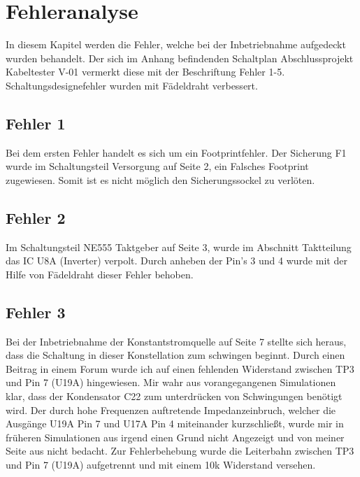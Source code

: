 \section{Fehleranalyse}

\begin{center}
In diesem Kapitel werden die Fehler, welche bei der Inbetriebnahme aufgedeckt wurden behandelt. Der sich im Anhang befindenden Schaltplan \glqq Abschlussprojekt Kabeltester  V-01\grqq{} vermerkt diese mit der Beschriftung \glqq Fehler 1-5\grqq{}. Schaltungsdesignefehler wurden mit Fädeldraht verbessert.  
\end{center}



\subsection{Fehler 1}

Bei dem ersten Fehler handelt es sich um ein Footprintfehler. Der Sicherung F1 wurde im Schaltungsteil \glqq Versorgung \grqq{} auf Seite 2, ein Falsches Footprint zugewiesen. Somit ist es nicht möglich den Sicherungssockel zu verlöten. 


\subsection{Fehler 2}

Im Schaltungsteil \glqq NE555 Taktgeber \grqq{} auf Seite 3, wurde im Abschnitt \glqq Taktteilung \grqq{} das IC U8A (Inverter) verpolt. Durch anheben der Pin's 3 und 4 wurde mit der Hilfe von Fädeldraht dieser Fehler behoben.



\subsection{Fehler 3}

Bei der Inbetriebnahme der Konstantstromquelle auf Seite 7 stellte sich heraus, dass die Schaltung in dieser Konstellation zum schwingen beginnt. Durch einen Beitrag in einem Forum wurde ich auf einen fehlenden Widerstand zwischen TP3 und Pin 7 (U19A) hingewiesen. Mir wahr aus vorangegangenen Simulationen klar, dass der Kondensator C22 zum unterdrücken von Schwingungen benötigt wird. Der durch hohe Frequenzen auftretende Impedanzeinbruch, welcher die Ausgänge U19A Pin 7 und U17A Pin 4 miteinander kurzschließt, wurde mir in früheren Simulationen aus irgend einen Grund nicht Angezeigt und von meiner Seite aus nicht bedacht. Zur Fehlerbehebung wurde die Leiterbahn zwischen TP3 und Pin 7 (U19A) aufgetrennt und mit einem 10k Widerstand versehen. 



